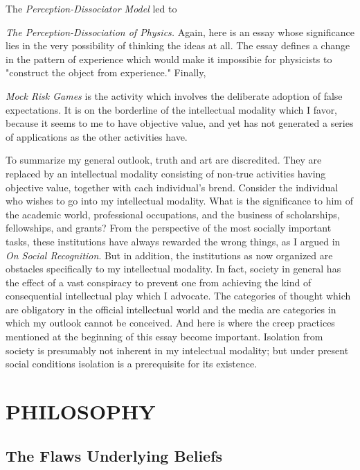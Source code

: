 \documentclass[10pt,twoside,draft]{memoir}
\newcommand{\essaytitle}[1]{
	\emph{#1}}
\begin{document}
The \essaytitle{Perception-Dissociator Model} led to 
\essaytitle{The Perception-Dissociation of Physics.} Again, here is an essay whose 
significance lies in the very possibility of thinking the ideas at all. The essay 
defines a change in the pattern of experience which would make it 
impossibie for physicists to "construct the object from experience." Finally, 
\essaytitle{Mock Risk Games} is the activity which involves the deliberate adoption of 
false expectations. It is on the borderline of the intellectual modality which I 
favor, because it seems to me to have objective value, and yet has not 
generated a series of applications as the other activities have. 

To summarize my general outlook, truth and art are discredited. They 
are replaced by an intellectual modality consisting of non-true activities 
having objective value, together with cach individual's brend. Consider the 
individual who wishes to go into my intellectual modality. What is the 
significance to him of the academic world, professional occupations, and the 
business of scholarships, fellowships, and grants? From the perspective of 
the most socially important tasks, these institutions have always rewarded 
the wrong things, as I argued in \essaytitle{On Social Recognition}. But in addition, the 
institutions as now organized are obstacles specifically to my intellectual 
modality. In fact, society in general has the effect of a vast conspiracy to 
prevent one from achieving the kind of consequential intellectual play which 
I advocate. The categories of thought which are obligatory in the official
intellectual world and the media are categories in which my outlook cannot 
be conceived. And here is where the creep practices mentioned at the 
beginning of this essay become important. Isolation from society is 
presumably not inherent in my intelectual modality; but under present 
social conditions isolation is a prerequisite for its existence. 


\part{PHILOSOPHY}


\chapter{The Flaws Underlying Beliefs}
\end{document}
